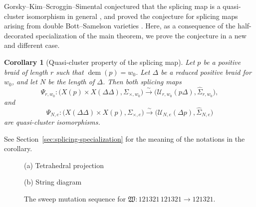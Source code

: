 \documentclass[10pt,a4paper]{article}
\newtheorem{corollary}[theorem]{Corollary}
\theoremstyle{definition}
\theoremstyle{remark}
\newcommand{\Ucal}{\mathcal U}
\newcommand{\fW}{\mathfrak W}
\begin{document}
Gorsky--Kim--Scroggin--Simental conjectured that the splicing map is a
quasi-cluster isomorphism in general
\cite[Conjecture~1.4(c)]{GorskyKimScrogginSimental2025}, and proved the
conjecture for splicing maps arising from double Bott--Samelson varieties
\cite[Theorem~1.8]{GorskyKimScrogginSimental2025}.  Here, as a consequence of
the half-decorated specialization of the main theorem, we prove the conjecture
in a new and different case.

\begin{corollary}[Quasi-cluster property of the splicing map]
\label{cor:splicing-conjecture-four-endpoints}
Let \(p\) be a positive braid of length \(r\) such that
\(\operatorname{dem}(p)=w_0\).  Let \(\Delta\) be a reduced positive braid for
\(w_0\), and let \(N\) be the length of \(\Delta\).  Then both splicing maps
\[
 \Psi_{r,w_0}:
 \bigl(X(p)\times X(\Delta \Delta),
       \Sigma_{\times,w_0}\bigr)
 \xrightarrow{\sim}
 \bigl(\Ucal_{r,w_0}(p\Delta),
       \widehat{\Sigma}_{r,w_0}\bigr),
\]
and
\[
 \Psi_{N,e}:
 \bigl(X(\Delta\Delta)\times X(p),
       \Sigma_{\times,e}\bigr)
 \xrightarrow{\sim}
 \bigl(\Ucal_{N,e}(\Delta p),
       \widehat{\Sigma}_{N,e}\bigr)
\]
are quasi-cluster isomorphisms.
\end{corollary}

See Section~\ref{sec:splicing-specialization} for the meaning of the notations in the corollary. 

\begin{figure}[!t]
\centering
\begin{minipage}[c]{0.49\textwidth}
 \centering
 \resizebox{\linewidth}{!}{}
 \par\smallskip
 {\small\textup{(a)} Tetrahedral projection}
\end{minipage}\hfill
\begin{minipage}[c]{0.46\textwidth}
 \centering
 \resizebox{\linewidth}{!}{}
 \par\smallskip
 {\small\textup{(b)} String diagram}
\end{minipage}
\caption{An \(A_3\) weave
\(\fW : \boldsymbol\Delta\boldsymbol\Delta\to\boldsymbol\Delta\), where
\(\boldsymbol\Delta=121321\), drawn as the tetrahedral projection and
the string diagram.}
\label{fig:a3-tetrahedral-weave}

\bigskip

\centering

\caption{The sweep mutation sequence for \(\fW:121321\,121321\to121321\).}
\label{fig:a3-sweep-quiver}
\end{figure}
\end{document}
